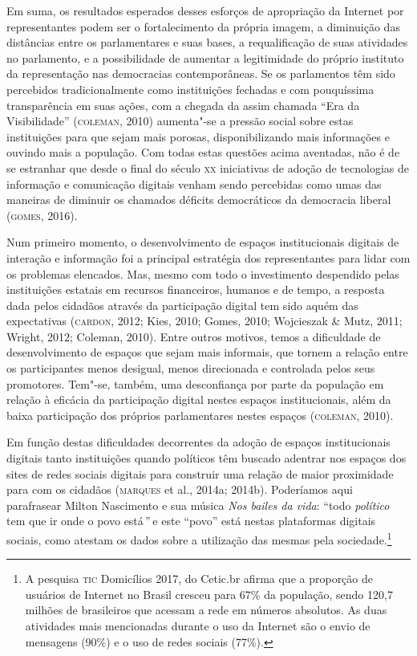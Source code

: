 Em suma, os resultados esperados desses esforços de apropriação da
Internet por representantes podem ser o fortalecimento da própria
imagem, a diminuição das distâncias entre os parlamentares e suas bases,
a requalificação de suas atividades no parlamento, e a possibilidade de
aumentar a legitimidade do próprio instituto da representação nas
democracias contemporâneas. Se os parlamentos têm sido percebidos
tradicionalmente como instituições fechadas e com pouquíssima
transparência em suas ações, com a chegada da assim chamada ``Era da
Visibilidade'' (\textsc{coleman}, 2010) aumenta"-se a pressão social sobre estas
instituições para que sejam mais porosas, disponibilizando mais
informações e ouvindo mais a população. Com todas estas questões acima
aventadas, não é de se estranhar que desde o final do século \textsc{xx}
iniciativas de adoção de tecnologias de informação e comunicação
digitais venham sendo percebidas como umas das maneiras de diminuir os
chamados déficits democráticos da democracia liberal (\textsc{gomes}, 2016).

Num primeiro momento, o desenvolvimento de espaços institucionais
digitais de interação e informação foi a principal estratégia dos
representantes para lidar com os problemas elencados. Mas, mesmo com
todo o investimento despendido pelas instituições estatais em recursos
financeiros, humanos e de tempo, a resposta dada pelos cidadãos através
da participação digital tem sido aquém das expectativas (\textsc{cardon}, 2012;
Kies, 2010; Gomes, 2010; Wojcieszak \& Mutz, 2011; Wright, 2012;
Coleman, 2010). Entre outros motivos, temos a dificuldade de
desenvolvimento de espaços que sejam mais informais, que tornem a
relação entre os participantes menos desigual, menos direcionada e
controlada pelos seus promotores. Tem"-se, também, uma desconfiança por
parte da população em relação à eficácia da participação digital nestes
espaços institucionais, além da baixa participação dos próprios
parlamentares nestes espaços (\textsc{coleman}, 2010).

Em função destas dificuldades decorrentes da adoção de espaços
institucionais digitais tanto instituições quando políticos têm buscado
adentrar nos espaços dos sites de redes sociais digitais para construir
uma relação de maior proximidade para com os cidadãos (\textsc{marques} et al.,
2014a; 2014b). Poderíamos aqui parafrasear Milton
Nascimento e sua música \textit{Nos bailes da vida}: ``todo
\textit{político} tem que ir onde o povo está\textit{''} e este ``povo''
está nestas plataformas digitais sociais, como atestam os dados sobre a
utilização das mesmas pela sociedade.\footnote{A pesquisa \textsc{tic} Domicílios
  2017, do Cetic.br afirma que a proporção de usuários de Internet no
  Brasil cresceu para 67\% da população, sendo 120,7 milhões de
  brasileiros que acessam a rede em números absolutos. As duas
  atividades mais mencionadas durante o uso da Internet são o envio de
  mensagens (90\%) e o uso de redes sociais (77\%).} %

